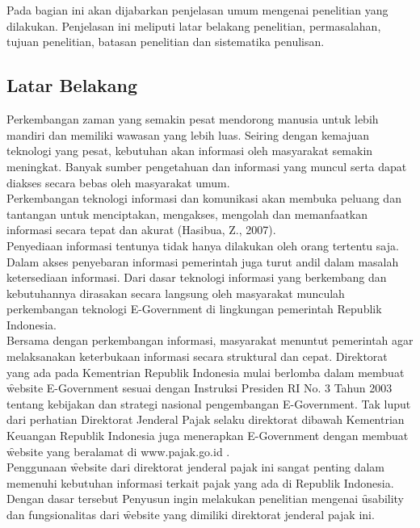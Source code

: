 \chapter{\babSatu}

Pada bagian ini akan dijabarkan penjelasan umum mengenai penelitian yang dilakukan. Penjelasan ini meliputi latar belakang penelitian, permasalahan, tujuan penelitian, batasan penelitian dan sistematika penulisan.

\section{Latar Belakang}
Perkembangan zaman yang semakin pesat mendorong manusia untuk lebih mandiri dan memiliki wawasan yang lebih luas. Seiring dengan kemajuan teknologi yang pesat, kebutuhan akan informasi oleh masyarakat semakin meningkat. Banyak sumber pengetahuan dan informasi yang muncul serta dapat diakses secara bebas oleh masyarakat umum.
\newline\\
Perkembangan teknologi informasi dan komunikasi akan membuka peluang dan tantangan untuk menciptakan, mengakses, mengolah dan memanfaatkan informasi secara tepat dan akurat (Hasibua, Z., 2007).  
\newline\\
Penyediaan informasi tentunya tidak hanya dilakukan oleh orang tertentu saja. Dalam akses penyebaran informasi pemerintah juga turut andil dalam masalah ketersediaan informasi. Dari dasar teknologi informasi yang berkembang dan kebutuhannya dirasakan secara langsung oleh masyarakat munculah perkembangan teknologi E-Government di lingkungan pemerintah Republik Indonesia. 
\newline\\
Bersama dengan perkembangan informasi, masyarakat menuntut pemerintah agar melaksanakan keterbukaan informasi secara struktural dan cepat. Direktorat yang ada pada Kementrian Republik Indonesia mulai berlomba dalam membuat \f{website} E-Government sesuai dengan Instruksi Presiden RI No. 3 Tahun 2003 tentang kebijakan dan strategi nasional pengembangan E-Government. Tak luput dari perhatian Direktorat Jenderal Pajak selaku direktorat dibawah Kementrian Keuangan Republik Indonesia juga menerapkan E-Government dengan membuat \f{website} yang beralamat di www.pajak.go.id . 
\newline\\
Penggunaan \f{website} dari direktorat jenderal pajak ini sangat penting dalam memenuhi kebutuhan informasi terkait pajak yang ada di Republik Indonesia. Dengan dasar tersebut Penyusun ingin melakukan penelitian mengenai \f{usability} dan fungsionalitas dari \f{website} yang dimiliki direktorat jenderal pajak ini.
